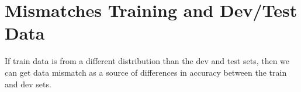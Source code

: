\section{Mismatches Training and Dev/Test Data}

If train data is from a different distribution than the dev and test sets, then we can get data mismatch as a source of differences in accuracy between the train and dev sets.